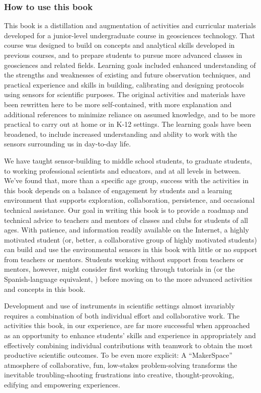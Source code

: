 \subsubsection{How to use this book}
This book is a distillation and augmentation of activities and curricular materials developed for a junior-level undergraduate course in geosciences technology.
That course was designed to build on concepts and analytical skills developed in previous courses, and to prepare students to pursue more advanced classes in geosciences and related fields.
Learning goals included enhanced understanding of the strengths and weaknesses of existing and future observation techniques, and practical experience and skills in building, calibrating and designing protocols using sensors for scientific purposes. 
The original activities and materials have been rewritten here to be more self-contained, with more explanation and additional references to minimize reliance on assumed knowledge, and to be more practical to carry out at home or in K-12 settings. The learning goals have been broadened, to include increased understanding and ability to work with the sensors surrounding us in day-to-day life.

We have taught sensor-building to middle school students, to graduate students, to working professional scientists and educators, and at all levels in between. 
We've found that, more than a specific age group, success with the activities in this book depends on a balance of engagement by students and a learning environment that supports exploration, collaboration, persistence, and occasional technical assistance.
Our goal in writing this book is to provide a roadmap and technical advice to teachers and mentors of classes and clubs for students of all ages.
With patience, and information readily available on the Internet, a highly motivated student (or, better, a collaborative group of highly motivated students) can build and use the environmental sensors in this book with little or no support from teachers or mentors.
Students working without support from teachers or mentors, however, might consider first working through tutorials in  (or the Spanish-language equivalent, ) before moving on to the more advanced activities and concepts in this book.

Development and use of instruments in scientific settings almost invariably requires a combination of both individual effort and collaborative work. 
The activities this book, in our experience, are far more successful when approached as an opportunity to enhance students' skills and experience in appropriately and effectively combining individual contributions with teamwork to obtain the most productive scientific outcomes. 
To be even more explicit: 
A ``MakerSpace'' atmosphere of collaborative, fun, low-stakes problem-solving transforms the inevitable troubling-shooting frustrations into creative, thought-provoking, edifying and empowering experiences.


